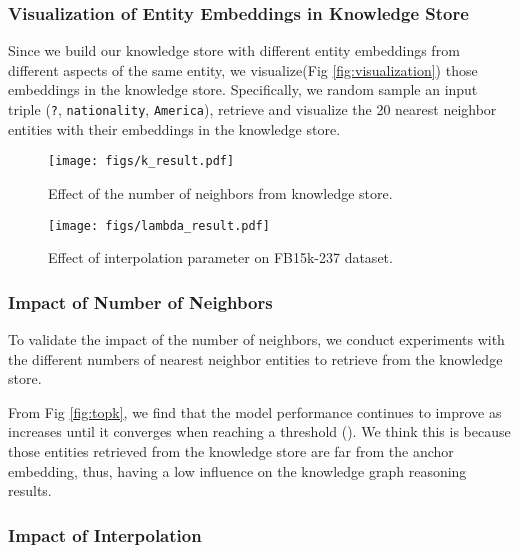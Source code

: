 \documentclass[runningheads]{llncs}
\begin{document}
\subsubsection{\textbf{Visualization of Entity Embeddings in Knowledge Store}}
Since we build our knowledge store with different entity embeddings from different aspects of the same entity, we visualize(Fig \ref{fig:visualization}) those embeddings in the knowledge store.
Specifically, we random sample an input triple (\texttt{?}, \texttt{nationality}, \texttt{America}),  retrieve and visualize the 20 nearest neighbor entities with their embeddings in the knowledge store.



\begin{figure}[htbp]
    \centering \begin{minipage}[b]{0.48\textwidth}
        \centering \texttt{[image: figs/k\_result.pdf]}
        \caption{Effect of the number of neighbors from knowledge store.}
        \label{fig:topk}
    \end{minipage}\hspace{3mm}\begin{minipage}[b]{0.48\textwidth}
        \centering \texttt{[image: figs/lambda\_result.pdf]}
        \caption{Effect of interpolation parameter  on FB15k-237 dataset.}
        \label{fig:lambda}
    \end{minipage}
\end{figure}



\subsubsection{\textbf{Impact of Number of Neighbors}}
To validate the impact of the number of neighbors, we conduct experiments with the different numbers of  nearest neighbor entities to retrieve from the knowledge store.

From  Fig \ref{fig:topk}, we find that the model performance continues to improve as  increases until it converges when reaching a threshold ().
We think this is because those entities retrieved from the knowledge store are far from the anchor embedding, thus, having a low influence on the knowledge graph reasoning results.



\subsubsection{\textbf{Impact of Interpolation}}
\end{document}
